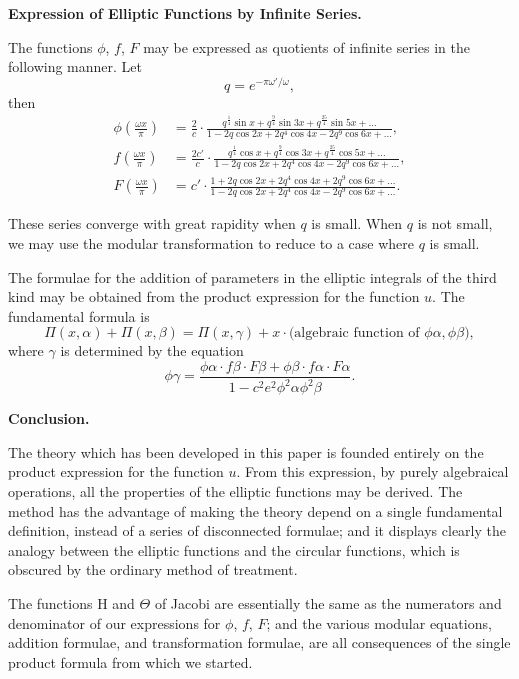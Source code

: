 \documentclass[12pt,a4paper]{article}
\begin{document}
\textbf{Expression of Elliptic Functions by Infinite Series.}

The functions $\phi$, $f$, $F$ may be expressed as quotients of infinite series in the
following manner. Let
\[
q = e^{-\pi \omega'/\omega},
\]
then
\begin{align*}
\phi\left(\frac{\omega x}{\pi}\right) &= \frac{2}{c} \cdot \frac{q^{\frac{1}{4}} \sin x + q^{\frac{9}{4}} \sin 3x + q^{\frac{25}{4}} \sin 5x + \ldots}{1 - 2q \cos 2x + 2q^4 \cos 4x - 2q^9 \cos 6x + \ldots},\\
f\left(\frac{\omega x}{\pi}\right) &= \frac{2c'}{c} \cdot \frac{q^{\frac{1}{4}} \cos x + q^{\frac{9}{4}} \cos 3x + q^{\frac{25}{4}} \cos 5x + \ldots}{1 - 2q \cos 2x + 2q^4 \cos 4x - 2q^9 \cos 6x + \ldots},\\
F\left(\frac{\omega x}{\pi}\right) &= c' \cdot \frac{1 + 2q \cos 2x + 2q^4 \cos 4x + 2q^9 \cos 6x + \ldots}{1 - 2q \cos 2x + 2q^4 \cos 4x - 2q^9 \cos 6x + \ldots}.
\end{align*}

\newpage
\setcounter{page}{153}

These series converge with great rapidity when $q$ is small. When $q$ is not small,
we may use the modular transformation to reduce to a case where $q$ is small.

The formulae for the addition of parameters in the elliptic integrals of the third
kind may be obtained from the product expression for the function $u$. The fundamental
formula is
\[
\Pi(x, \alpha) + \Pi(x, \beta) = \Pi(x, \gamma) + x \cdot \text{(algebraic function of } \phi\alpha, \phi\beta),
\]
where $\gamma$ is determined by the equation
\[
\phi\gamma = \frac{\phi\alpha \cdot f\beta \cdot F\beta + \phi\beta \cdot f\alpha \cdot F\alpha}{1 - c^2 e^2 \phi^2\alpha \phi^2\beta}.
\]

\newpage
\setcounter{page}{154}

\textbf{Conclusion.}

The theory which has been developed in this paper is founded entirely on the
product expression for the function $u$. From this expression, by purely algebraical
operations, all the properties of the elliptic functions may be derived. The method has
the advantage of making the theory depend on a single fundamental definition, instead
of a series of disconnected formulae; and it displays clearly the analogy between the
elliptic functions and the circular functions, which is obscured by the ordinary method
of treatment.

The functions $\mathrm{H}$ and $\Theta$ of Jacobi are essentially the same as the numerators and
denominator of our expressions for $\phi$, $f$, $F$; and the various modular equations,
addition formulae, and transformation formulae, are all consequences of the single
product formula from which we started.
\end{document}
